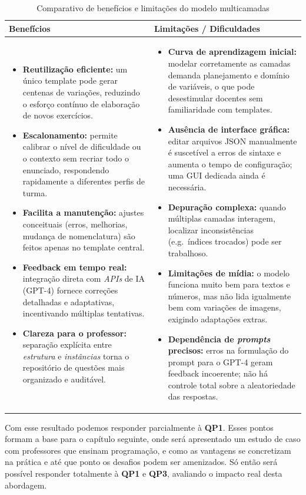 \begin{table}[H]
\centering
\caption{Comparativo de benefícios e limitações do modelo multicamadas}
\label{tab:beneficios-limitacoes}
\begin{tabular}{|p{7cm}|p{7cm}|}
\hline
\textbf{Benefícios} & \textbf{Limitações / Dificuldades} \\ \hline
\begin{itemize}[leftmargin=*]
    \item \textbf{Reutilização eficiente:} um único template pode gerar centenas de variações, reduzindo o esforço contínuo de elaboração de novos exercícios.%
    \item \textbf{Escalonamento:} permite calibrar o nível de dificuldade ou o contexto sem recriar todo o enunciado, respondendo rapidamente a diferentes perfis de turma.%
    \item \textbf{Facilita a manutenção:} ajustes conceituais (erros, melhorias, mudança de nomenclatura) são feitos apenas no template central.%
    \item \textbf{Feedback em tempo real:} integração direta com \textit{APIs} de IA (GPT-4) fornece correções detalhadas e adaptativas, incentivando múltiplas tentativas.%
    \item \textbf{Clareza para o professor:} separação explícita entre \emph{estrutura} e \emph{instâncias} torna o repositório de questões mais organizado e auditável.%
\end{itemize} &
\begin{itemize}[leftmargin=*]
    \item \textbf{Curva de aprendizagem inicial:} modelar corretamente as camadas demanda planejamento e domínio de variáveis, o que pode desestimular docentes sem familiaridade com templates.%
    \item \textbf{Ausência de interface gráfica:} editar arquivos JSON manualmente é suscetível a erros de sintaxe e aumenta o tempo de configuração; uma GUI dedicada ainda é necessária.%
    \item \textbf{Depuração complexa:} quando múltiplas camadas interagem, localizar inconsistências (e.g.\ índices trocados) pode ser trabalhoso.%
    \item \textbf{Limitações de mídia:} o modelo funciona muito bem para textos e números, mas não lida igualmente bem com variações de imagens, exigindo adaptações extras.%
    \item \textbf{Dependência de \textit{prompts} precisos:} erros na formulação do prompt para o GPT-4 geram feedback incoerente; não há controle total sobre a aleatoriedade das respostas.%
\end{itemize} \\ \hline
\end{tabular}
\end{table}


Com esse resultado podemos responder parcialmente à \textbf{QP1}. Esses pontos formam a base para o capítulo seguinte, onde será apresentado um estudo de caso com professores que ensinam programação, e como as vantagens se concretizam na prática e até que ponto os desafios podem ser amenizados. Só então será possível responder totalmente à \textbf{QP1} e \textbf{QP3}, avaliando o impacto real desta abordagem.

